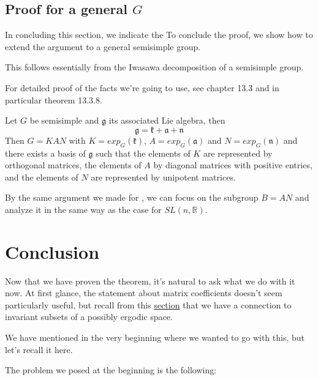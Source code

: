 \documentclass[
  12pt
]{article}
\theoremstyle{break}
\theoremstyle{plain}
\newcommand{\G}{\ensuremath{G}\xspace}
\newcommand{\slnr}{\ensuremath{SL(n, \mathbb{R})}\xspace}
\newcommand{\frg}{\ensuremath{\mathfrak{g}}\xspace}
\newcommand{\frk}{\ensuremath{\mathfrak{k}}\xspace}
\newcommand{\fra}{\ensuremath{\mathfrak{a}}\xspace}
\newcommand{\frnn}{\ensuremath{\mathfrak{n}}\xspace}
\begin{document}


\hypertarget{proof-for-a-general-G}{%
\subsection{Proof for a general \texorpdfstring{$G$}{G}}\label{proof-for-a-general-G}}



   In concluding this section, we indicate the
   To conclude the proof, we show how to extend the argument to a general semisimple group.

   This follows essentially from the Iwasawa decomposition of a semisimple group.

   For detailed proof of the facts we're going to use, see \citeauthor{Hilgert2012}\cite{Hilgert2012} chapter 13.3 and in particular theorem 13.3.8.
   
   Let \G be semisimple and $\mathfrak{g}$ its associated Lie algebra, then 
   $$\frg = \frk + \fra + \frnn$$
   Then $G =KAN$ with $K=exp_G(\frk)$, $A=exp_G(\fra)$ and $N=exp_G(\frnn)$
   and there exists a basis of \frg such that the elements of $K$ are represented by orthogonal matrices, the elements of $A$ by diagonal matrices with positive entries, and the elements of $N$ are represented by unipotent matrices.

   By the same argument we made for , we can focus on the subgroup $B=AN$ and analyze it in the same way as the case for \slnr.




\hypertarget{outro}{%
\section{Conclusion}\label{outro}}


  Now that we have proven the theorem, it's natural to ask what we do with it now.
  At first glance, the statement about matrix coefficients doesn't seem particularly useful,
  but recall from this \hyperref[the-connection-between-ergodicity-and-unitary-representations]{section}
  that we have a connection to invariant subsets of a possibly ergodic space.

  We have mentioned in the very beginning where we wanted to go with this, but let's recall it here.

  The problem we posed at the beginning is the following:
\end{document}
